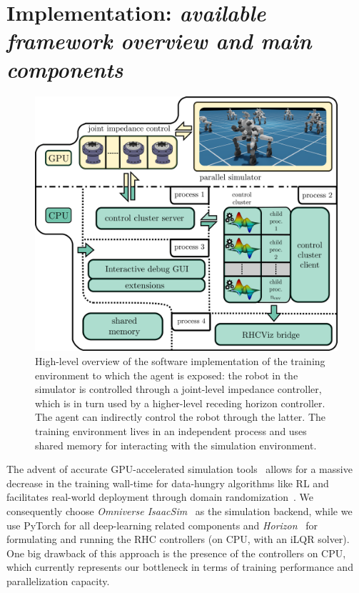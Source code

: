 \section{Implementation: \textnormal{\textit{available framework overview and main components}}}
\begin{figure}[t]
	\centering
	\includegraphics[width=0.9\columnwidth]{imgs/cocluster_arch.pdf}
	\caption{High-level overview of the software implementation of the training environment to which the agent is exposed: the robot in the simulator is controlled through a joint-level impedance controller, which is in turn used by a higher-level receding horizon controller. The agent can indirectly control the robot through the latter. The training environment lives in an independent process and uses shared memory for interacting with the simulation environment.}
	\label{fig:coclbridge_arch}
\end{figure}
The advent of accurate GPU-accelerated simulation tools~\cite{web::isaacsim,rl:mujocoaccelereted2023} allows for a massive decrease in the training wall-time for data-hungry algorithms like RL and facilitates real-world deployment through domain randomization~\cite{rl:rudin2022learning,rl:rudin2022advanced}. We consequently choose \textit{Omniverse IsaacSim}~\cite{web::isaacsim} as the simulation backend, while we use PyTorch for all deep-learning related components and  \textit{Horizon}~\cite{frameworks::horizon_to} for formulating and running the RHC controllers (on CPU, with an iLQR solver). One big drawback of this approach is the presence of the controllers on CPU, which currently represents our bottleneck in terms of training performance and parallelization capacity.
